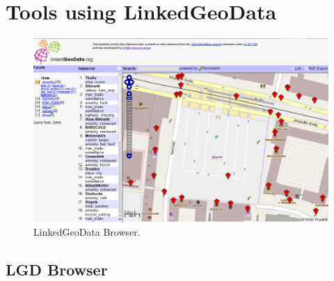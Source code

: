 


\section{Tools using LinkedGeoData}
\label{sec:applications}

\begin{figure}[tb]
	\includegraphics[width=.85\textwidth]{images/LGDBrowser}
	\caption{LinkedGeoData Browser.}
	\label{fig:browser}
\end{figure}

\subsection{LGD Browser}

